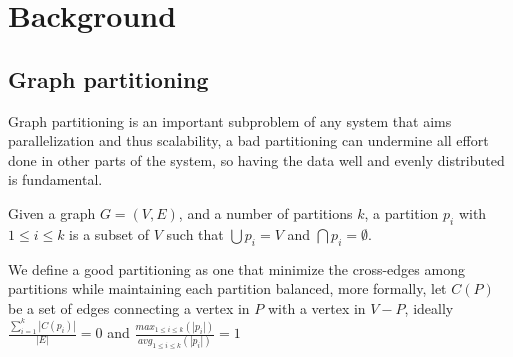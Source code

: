 \section{Background}
\subsection{Graph partitioning}
Graph partitioning is an important subproblem of any system that aims parallelization and thus scalability, a bad partitioning can undermine all effort done in other parts of the system, so having the data well and evenly distributed is fundamental.


Given a graph $G = (V, E)$, and a number of partitions $k$, a partition $p_i$ with $1 \leq i \leq k$ is a subset of $V$ such that $\bigcup p_i = V$ and $\bigcap p_i = \emptyset$.

We define a good partitioning as one that minimize the cross-edges among partitions while maintaining each partition balanced, more formally, let $C(P)$ be a set of edges connecting a vertex in $P$ with a vertex in $V - P$, ideally $\frac{\sum_{i=1}^{k}|C(p_i)|}{|E|} = 0$ and $\frac{max_{1 \leq i \leq k}(|p_i|)}{avg_{1 \leq i \leq k}(|p_i|)} = 1$